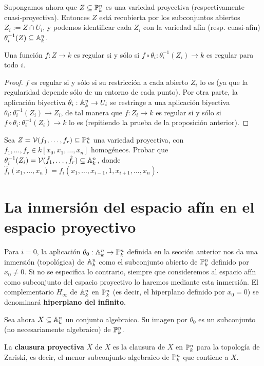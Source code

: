 \documentclass[ACGA.tex]{subfiles}
\begin{document}
Supongamos ahora que $Z\subseteq\mathbb{P}^n_k$ es una variedad proyectiva (respectivamente cuasi-proyectiva). Entonces $Z$ está recubierta por los subconjuntos abiertos $Z_i:=Z\cap U_i$, y podemos identificar cada $Z_i$ con la variedad afín (resp. cuasi-afín) $\theta_i^{-1}(Z)\subseteq\mathbb{A}^n_k$. 

\begin{prop}
 Una función $f:Z\to k$ es regular si y sólo si $f\circ\theta_i:\theta_i^{-1}(Z_i)\to k$ es regular para todo $i$. 
\end{prop}

\begin{proof}
 $f$ es regular si y sólo si su restricción a cada abierto $Z_i$ lo es (ya que la regularidad depende sólo de un entorno de cada punto). Por otra parte, la aplicación biyectiva $\theta_i:\mathbb{A}^n_k\to U_i$ se restringe a una aplicación biyectiva $\theta_i:\theta_i^{-1}(Z_i)\to Z_i$, de tal manera que $f:Z_i\to k$ es regular si y sólo si $f\circ\theta_i:\theta_i^{-1}(Z_i)\to k$ lo es (repitiendo la prueba de la proposición anterior).
\end{proof}

\begin{ejer}
 Sea $Z=\mathcal{V}(f_1,\ldots,f_r)\subseteq\mathbb{P}^n_k$ una variedad proyectiva, con $f_1,\ldots,f_r\in k[x_0,x_1,\ldots,x_n]$ homogéneos. Probar que $\theta^{-1}_i(Z_i)=\mathcal{V}(\hat f_1,\ldots,\hat f_r)\subseteq\mathbb{A}^n_k$, donde $\hat f_i(x_1,\ldots,x_n)=f_i(x_1,\ldots,x_{i-1},1,x_{i+1},\ldots,x_n)$.
\end{ejer}

\section{La inmersión del espacio afín en el espacio proyectivo}

Para $i=0$, la aplicación $\theta_0:\mathbb{A}^n_k\to\mathbb{P}^n_k$ definida en la sección anterior nos da una inmersión (topológica) de $\mathbb{A}^n_k$ como el subconjunto abierto de $\mathbb{P}^n_k$ definido por $x_0\neq 0$. Si no se especifica lo contrario, siempre que consideremos al espacio afín como subconjunto del espacio proyectivo lo haremos mediante esta inmersión. El complementario $H_\infty$ de $\mathbb{A}^n_k$ en $\mathbb{P}^n_k$ (es decir, el hiperplano definido por $x_0=0$) se denominará {\bf hiperplano del infinito}.

Sea ahora $X\subseteq \mathbb{A}^n_k$ un conjunto algebraico. Su imagen por $\theta_0$ es un subconjunto (no necesariamente algebraico) de $\mathbb{P}^n_k$. 

\begin{defi}
 La {\bf clausura proyectiva} $\overline X$ de $X$ es la clausura de $X$ en $\mathbb{P}^n_k$ para la topología de Zariski, es decir, el menor subconjunto algebraico de $\mathbb{P}^n_k$ que contiene a $X$.
\end{defi}
\end{document}
